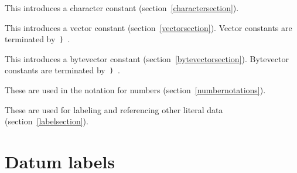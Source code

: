 \begin{description}{}{}
\item[\sharpsign\backwhack]
This introduces a character constant (section~\ref{charactersection}).

\item[\sharpsign\tt(]
This introduces a vector constant (section~\ref{vectorsection}).  Vector constants
are terminated by~{\tt)}~.

\item[\sharpsign\tt u8(]
This introduces a bytevector constant (section~\ref{bytevectorsection}).  Bytevector constants
are terminated by~{\tt)}~.

\item[{\tt\#e \#i \#b \#o \#d \#x}]
These are used in the notation for numbers (section~\ref{numbernotations}).

\item[\tt{\#\hyper{n}= \#\hyper{n}\#}]
These are used for labeling and referencing other literal data (section~\ref{labelsection}).

\end{description}

\section{Datum labels}\unsection
\label{labelsection}

